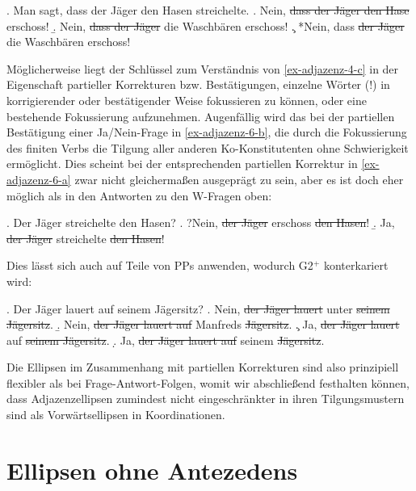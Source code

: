 \ex. \label{ex-adjazenz-5}Man sagt, dass der Jäger den Hasen streichelte.
\a. Nein, \sout{dass der Jäger den Hase} erschoss!
\b. Nein, \sout{dass der Jäger} die Waschbären erschoss!
\c. *Nein, dass \sout{der Jäger} die Waschbären erschoss!

Möglicherweise liegt der Schlüssel zum Verständnis von \ref{ex-adjazenz-4-c} in der Eigenschaft partieller Korrekturen bzw. Bestätigungen, einzelne Wörter (!) in korrigierender oder bestätigender Weise fokussieren zu können, oder eine bestehende  Fokussierung aufzunehmen. Augenfällig wird das bei der partiellen Bestätigung einer Ja/Nein-Frage in \ref{ex-adjazenz-6-b}, die durch die Fokussierung des finiten Verbs die Tilgung aller anderen Ko-Konstitutenten ohne Schwierigkeit ermöglicht. Dies scheint bei der entsprechenden partiellen Korrektur in \ref{ex-adjazenz-6-a} zwar nicht gleicherma\ss en ausgeprägt zu sein, aber es ist doch eher möglich als in den Antworten zu den W-Fragen oben:  

\ex. \label{ex-adjazenz-6}Der Jäger streichelte den Hasen?
\a. ?Nein, \sout{der Jäger} erschoss \sout{den Hasen}!\label{ex-adjazenz-6-a}
\b. Ja, \sout{der Jäger} streichelte \sout{den Hasen}!\label{ex-adjazenz-6-b}

Dies lässt sich auch auf Teile von PPs anwenden, wodurch G2$^+$ konterkariert wird:

\ex. \label{ex-adjazenz-7} Der Jäger lauert auf seinem Jägersitz?
\a. \label{ex-adjazenz-7} Nein, \sout{der Jäger lauert} unter \sout{seinem Jägersitz}. \b. Nein, \sout{der Jäger lauert auf} Manfreds \sout{Jägersitz}.
\c. Ja, \label{ex-adjazenz-7} \sout{der Jäger lauert} auf \sout{seinem Jägersitz}.
\d. Ja, \label{ex-adjazenz-7} \sout{der Jäger lauert auf} seinem \sout{Jägersitz}.

Die Ellipsen im Zusammenhang mit partiellen Korrekturen sind also prinzipiell flexibler als bei Frage-Antwort-Folgen, womit wir abschlie\ss end festhalten können, dass  Adjazenzellipsen zumindest nicht eingeschränkter in ihren Tilgungsmustern sind als Vorwärtsellipsen in Koordinationen.


\section{Ellipsen ohne Antezedens} \label{sec-situative-ellipsen}


